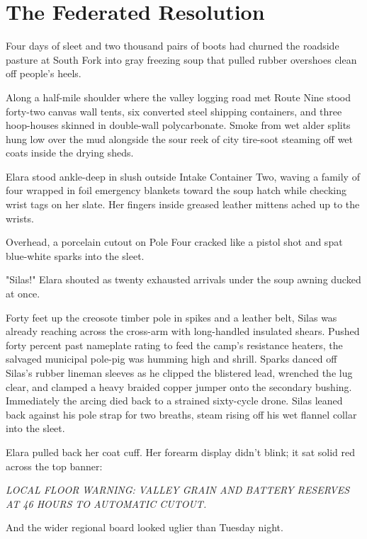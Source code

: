 \chapter{The Federated Resolution}

Four days of sleet and two thousand pairs of boots had churned the roadside pasture at South Fork into gray freezing soup that pulled rubber overshoes clean off people's heels.

Along a half-mile shoulder where the valley logging road met Route Nine stood forty-two canvas wall tents, six converted steel shipping containers, and three hoop-houses skinned in double-wall polycarbonate. Smoke from wet alder splits hung low over the mud alongside the sour reek of city tire-soot steaming off wet coats inside the drying sheds.

Elara stood ankle-deep in slush outside Intake Container Two, waving a family of four wrapped in foil emergency blankets toward the soup hatch while checking wrist tags on her slate. Her fingers inside greased leather mittens ached up to the wrists.

Overhead, a porcelain cutout on Pole Four cracked like a pistol shot and spat blue-white sparks into the sleet.

"Silas!" Elara shouted as twenty exhausted arrivals under the soup awning ducked at once.

Forty feet up the creosote timber pole in spikes and a leather belt, Silas was already reaching across the cross-arm with long-handled insulated shears. Pushed forty percent past nameplate rating to feed the camp's resistance heaters, the salvaged municipal pole-pig was humming high and shrill. Sparks danced off Silas's rubber lineman sleeves as he clipped the blistered lead, wrenched the lug clear, and clamped a heavy braided copper jumper onto the secondary bushing. Immediately the arcing died back to a strained sixty-cycle drone. Silas leaned back against his pole strap for two breaths, steam rising off his wet flannel collar into the sleet.

Elara pulled back her coat cuff. Her forearm display didn't blink; it sat solid red across the top banner:

\textit{LOCAL FLOOR WARNING: VALLEY GRAIN AND BATTERY RESERVES AT 46 HOURS TO AUTOMATIC CUTOUT.}

And the wider regional board looked uglier than Tuesday night.

